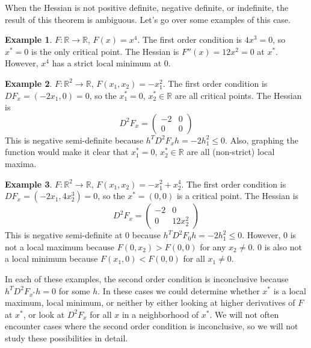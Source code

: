 \documentclass[12pt,reqno]{amsart}
\theoremstyle{definition}
\newtheorem{example}{Example}[section]
\def\R{\mathbb{R}}
\renewcommand{\to}{{\rightarrow}}
\begin{document}
When the Hessian is not positive definite, negative definite, or
indefinite, the result of this theorem is ambiguous. Let's go over
some examples of this case.
\begin{example}
  $F:\R \to \R$, $F(x) = x^4$. The first order condition is $4x^3 =
  0$, so $x^* = 0$ is the only critical point. The Hessian is $F''(x)
  = 12x^2 = 0$ at $x^*$. However, $x^4$ has a strict local minimum at
  $0$.
\end{example}

\begin{example}
  $F: \R^2 \to \R$, $F(x_1,x_2) = -x_1^2$. The first order condition is
  $DF_x = (-2x_1,0) = 0$, so the $x_1^*=0$, $x_2^* \in \R$ are all
  critical points. The Hessian is
  \[ D^2 F_x = \begin{pmatrix} -2 & 0 \\
    0 & 0 \end{pmatrix} \]
  This is negative semi-definite because $h^T D^2 F_x h = -2 h_1^2
  \leq 0$. Also, graphing the function would make it clear that
  $x_1^*=0$, $x_2^* \in \R$ are all (non-strict) local maxima. 
\end{example}

\begin{example}
  $F: \R^2 \to \R$, $F(x_1,x_2) = -x_1^2 + x_2^4$. The first order
  condition is $DF_x = (-2x_1,4 x_2^3) = 0$, so the $x^* = (0,0)$ is a
  critical point. The Hessian is  
  \[ D^2 F_x = \begin{pmatrix} -2 & 0 \\
    0 & 12 x_2^2 \end{pmatrix} \]
  This is negative semi-definite at $0$ because $h^T D^2 F_0 h = -2 h_1^2
  \leq 0$. However, $0$ is not a local maximum because $F(0,x_2)>
  F(0,0)$ for any $x_2 \neq 0$. $0$ is also not a local minimum
  because $F(x_1,0) < F(0,0)$ for all $x_1 \neq 0$.
\end{example}
In each of these examples, the second order condition is inconclusive
because $h^T D^2 F_{x^*} h = 0$ for some $h$. In these cases we could
determine whether $x^*$ is a local maximum, local minimum, or neither
by either looking at higher derivatives of $F$ at $x^*$, or look at
$D^2 F_{x}$ for all $x$ in a neighborhood of $x^*$. We will not often
encounter cases where the second order condition is inconclusive, so
we will not study these possibilities in detail.
\end{document}
